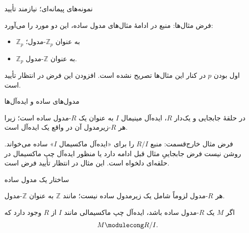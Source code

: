 \begin{frame}[t]{نمونه‌های پیمانه‌ای؛ نیازمند تأیید}
    \label{lec05:prime-examples-pending}
    \begin{alertblock}{فرض مثال‌ها: }
        منبع در ادامهٔ مثال‌های مدول ساده، این دو مورد را می‌آورد:
        \begin{itemize}
            \item $\mathbb{Z}_p$ به عنوان $\mathbb{Z}_p$-مدول؛
            \item $\mathbb{Z}_p$ به عنوان $\mathbb{Z}$-مدول.
        \end{itemize}
        اول بودن $p$ در کنار این مثال‌ها تصریح نشده است.
        افزودن این فرض در انتظار تأیید است.
    \end{alertblock}
\end{frame}

\begin{frame}[t]{مدول‌های ساده و ایده‌آل‌ها}
    \label{lec05:ideal-examples}
    \begin{example}
        در حلقهٔ جابجایی و یک‌دار $R$، ایده‌آل مینیمال $I$
        به عنوان یک $R$-مدول ساده است؛ زیرا هر $R$-زیرمدول آن
        در واقع یک ایده‌آل است.
    \end{example}
    \begin{alertblock}{فرض مثال خارج‌قسمت: }
        منبع $R/I$ را برای «ایده‌آل ماکسیمال $I$» ساده می‌خواند.
        روشن نیست فرض جابجاییِ مثال قبل ادامه دارد یا منظور
        ایده‌آل \alert{چپ} ماکسیمال در حلقه‌ای دلخواه است.
        این مثال در انتظار تأیید فرض است.
    \end{alertblock}
\end{frame}

\begin{frame}[t]{ساختار یک مدول ساده}
    \label{lec05:simple-classification}
    \begin{remark}
        هر $R$-مدول لزوماً شامل یک زیرمدول ساده نیست؛
        مانند $\mathbb{Z}$ به عنوان $\mathbb{Z}$-مدول.
    \end{remark}
    \begin{theorem}
        اگر $M$ یک $R$-مدول ساده باشد، ایده‌آل چپ ماکسیمالی
        مانند $I$ از $R$ وجود دارد که
        \[
            M\modulecong R/I.
        \]
    \end{theorem}
\end{frame}

